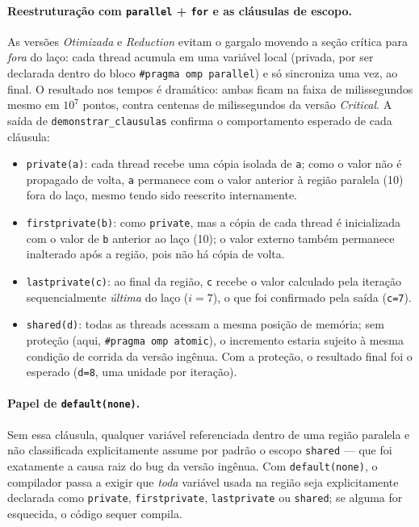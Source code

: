 \documentclass[a4paper,12pt]{article}
\begin{document}
\paragraph{Reestruturação com \texttt{parallel} + \texttt{for} e as cláusulas de escopo.} As versões \emph{Otimizada} e \emph{Reduction} evitam o gargalo movendo a seção crítica para \emph{fora} do laço: cada thread acumula em uma variável local (privada, por ser declarada dentro do bloco \texttt{\#pragma omp parallel}) e só sincroniza uma vez, ao final. O resultado nos tempos é dramático: ambas ficam na faixa de milissegundos mesmo em $10^7$ pontos, contra centenas de milissegundos da versão \emph{Critical}. A saída de \texttt{demonstrar\_clausulas} confirma o comportamento esperado de cada cláusula:

\begin{itemize}
    \item \texttt{private(a)}: cada thread recebe uma cópia isolada de \texttt{a}; como o valor não é propagado de volta, \texttt{a} permanece com o valor anterior à região paralela (10) fora do laço, mesmo tendo sido reescrito internamente.
    \item \texttt{firstprivate(b)}: como \texttt{private}, mas a cópia de cada thread é inicializada com o valor de \texttt{b} anterior ao laço (10); o valor externo também permanece inalterado após a região, pois não há cópia de volta.
    \item \texttt{lastprivate(c)}: ao final da região, \texttt{c} recebe o valor calculado pela iteração sequencialmente \emph{última} do laço ($i=7$), o que foi confirmado pela saída (\texttt{c=7}).
    \item \texttt{shared(d)}: todas as threads acessam a mesma posição de memória; sem proteção (aqui, \texttt{\#pragma omp atomic}), o incremento estaria sujeito à mesma condição de corrida da versão ingênua. Com a proteção, o resultado final foi o esperado (\texttt{d=8}, uma unidade por iteração).
\end{itemize}

\paragraph{Papel de \texttt{default(none)}.} Sem essa cláusula, qualquer variável referenciada dentro de uma região paralela e não classificada explicitamente assume 
por padrão o escopo \texttt{shared} — que foi exatamente a causa raiz do bug da versão ingênua. Com \texttt{default(none)}, o compilador passa a exigir que \emph{toda} 
variável usada na região seja explicitamente declarada como \texttt{private}, \texttt{firstprivate}, \texttt{lastprivate} ou \texttt{shared}; se alguma for esquecida, o código sequer compila.
\end{document}
